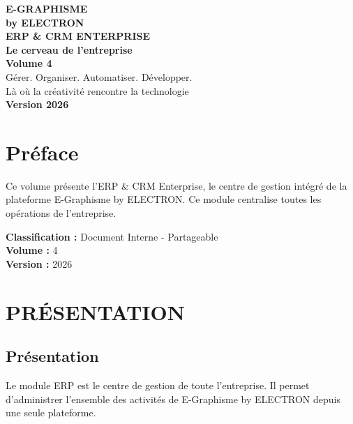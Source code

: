\documentclass[12pt,a4paper,oneside]{book}
\begin{document}
\begin{titlepage}
\thispagestyle{empty}
\begin{center}
\vspace*{2cm}
{\Huge\bfseries\color{electronblue}E-GRAPHISME}\\[0.3cm]
{\LARGE\bfseries\color{electronpurple}by ELECTRON}\\[2cm]
\vspace{2cm}
{\huge\bfseries\color{darkbg}ERP \& CRM ENTERPRISE}\\[0.3cm]
{\huge\bfseries\color{darkbg}Le cerveau de l'entreprise}\\[1cm]
{\Large\bfseries\color{electroncyan}Volume 4}\\[3cm]
\vspace{2cm}
{\Large\color{mediumgray}Gérer. Organiser. Automatiser. Développer.}\\[1cm]
{\Large\color{mediumgray}Là où la créativité rencontre la technologie}\\[3cm]
{\Large\bfseries\color{electrongold}Version 2026}\\[2cm]
\vfill
\end{center}
\end{titlepage}

\frontmatter

\chapter*{Préface}
Ce volume présente l'ERP \& CRM Enterprise, le centre de gestion intégré de la plateforme E-Graphisme by ELECTRON. Ce module centralise toutes les opérations de l'entreprise.

\bigskip
\textbf{Classification :} Document Interne - Partageable\\
\textbf{Volume :} 4\\
\textbf{Version :} 2026

\tableofcontents

\mainmatter

\chapter{PRÉSENTATION}

\section{Présentation}
Le module ERP est le centre de gestion de toute l'entreprise. Il permet d'administrer l'ensemble des activités de E-Graphisme by ELECTRON depuis une seule plateforme.
\end{document}
